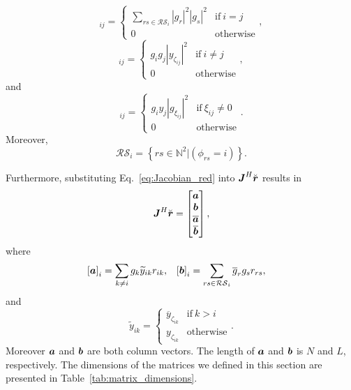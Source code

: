\documentclass[useAMS,usenatbib]{mn2e}
\newcommand{\bE}{\bmath{E}}
\newcommand{\bF}{\bmath{F}}
\newcommand{\br}{\bmath{r}}
\newcommand{\bJ}{\bmath{J}}
\newcommand{\ba}{\bmath{a}}
\newcommand{\bb}{\bmath{b}}
\newcommand{\conj}[1]{\overline{#1}}
\begin{document}
\begin{equation}
[\bE]_{ij} = 
\begin{cases}
 \sum_{rs \in \mathcal{RS}_i} \left | g_r \right |^2 \left | g_s \right |^2  & \textrm{if} ~ i=j\\
 0 & \textrm{otherwise}
\end{cases},
\end{equation}
\begin{equation}
[\bF]_{ij} = 
\begin{cases}
 g_i g_j  \left | y_{\zeta_{ij}} \right |^2  & \textrm{if} ~ i \neq j\\
 0 & \textrm{otherwise}
\end{cases},
\end{equation}
and
\begin{equation}
[\boldsymbol{G}]_{ij} = 
\begin{cases}
 g_i y_j  \left | g_{\xi_{ij}} \right |^2  & \textrm{if} ~ \xi_{ij}\neq0\\
 0 & \textrm{otherwise}
\end{cases}.
\end{equation}
Moreover, 
\begin{equation}
\mathcal{RS}_i = \left\{rs\in\mathbb{N}^2|(\phi_{rs} = i) \right\}.
\end{equation}

Furthermore, substituting Eq.~\eqref{eq:Jacobian_red} into $\bJ^H\breve{\br}$ results in
\begin{equation}
\bJ^H\breve{\br} = \begin{bmatrix}
                   \ba \\
                   \bb \\
                   \conj{\ba}\\
                   \conj{\bb}
                   \end{bmatrix},
\end{equation}
where
\begin{align}
\label{eq:ab}
\left [ \ba \right ]_i &= \sum_{k\neq i} g_k \widetilde{y}_{ik}r_{ik},  & \left [ \bb \right ]_i &= \sum_{rs\in\mathcal{RS}_i}\conj{g}_r g_s r_{rs},
\end{align}
and
\begin{equation}
\widetilde{y}_{ik} = 
\begin{cases}
\conj{y}_{\zeta_{ik}} & \textrm{if}~k > i\\
y_{\zeta_{ik}} & \textrm{otherwise}
\end{cases}.
\end{equation}
Moreover $\ba$ and $\bb$ are both column vectors. The length of $\ba$ and $\bb$ is $N$ and $L$, respectively.
The dimensions of the matrices we defined in this section are presented in Table~\ref{tab:matrix_dimensions}.
\end{document}
